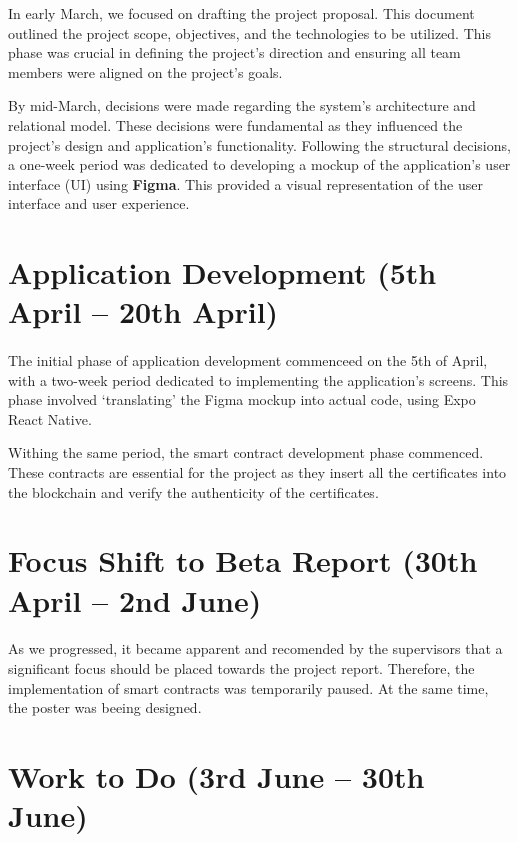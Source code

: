 In early March, we focused on drafting the project proposal. This document outlined the project scope, objectives, and the
technologies to be utilized. This phase was crucial in defining the project's direction and ensuring all team members were aligned on the project's goals.

By mid-March, decisions were made regarding the system's architecture and relational model. These decisions were fundamental as they influenced the project's design
and application's functionality. Following the structural decisions, a one-week period was dedicated to developing a mockup of the application's user interface (UI)
using \textbf{Figma}. This provided a visual representation of the user interface and user experience.

\section{Application Development (5th April – 20th April)}
\paragraph{}

The initial phase of application development commenceed on the 5th of April, with a two-week period dedicated to implementing the application's screens.
This phase involved `translating' the Figma mockup into actual code, using Expo React Native.

Withing the same period, the smart contract development phase commenced. These contracts are essential for the project as they insert
all the certificates into the blockchain and verify the authenticity of the certificates.

\section{Focus Shift to Beta Report (30th April – 2nd June)}
\paragraph{}

As we progressed, it became apparent and recomended by the supervisors that a significant focus should be placed towards the project report.
Therefore, the implementation of smart contracts was temporarily paused.
At the same time, the poster was beeing designed.

\section{Work to Do (3rd June – 30th June)}
